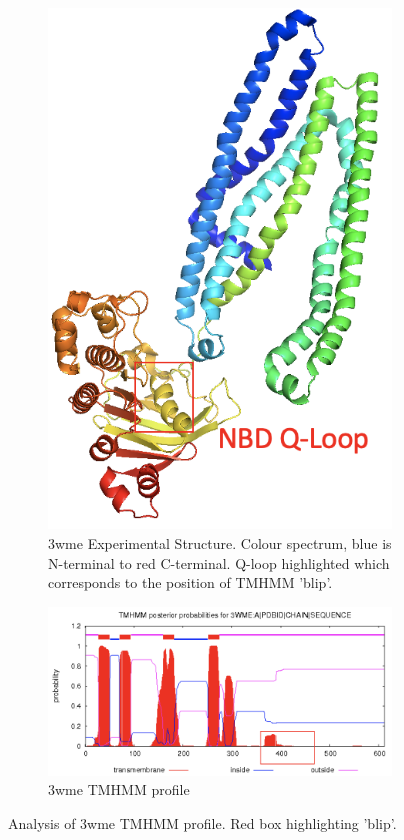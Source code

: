 \begin{figure}[htb]
\begin{subfigure}{0.3\textwidth}
  \includegraphics[width=\linewidth]{introduction/3wme.png}
  \caption{3wme Experimental Structure.  Colour spectrum, blue is N-terminal to red C-terminal.  Q-loop highlighted which corresponds to the position of TMHMM 'blip'.}
  \label{fig:0}
\end{subfigure}\hfil %
\begin{subfigure}{0.5\textwidth}
  \includegraphics[width=\linewidth]{introduction/3wme_tmhmm.png}
  \caption{3wme TMHMM profile}
  \label{fig:atg9_tmhmm}
\end{subfigure}\hfil %
\caption{Analysis of 3wme TMHMM profile.  Red box highlighting 'blip'. }
\small
\label{fig:3wme_tmhmm}
\end{figure}

